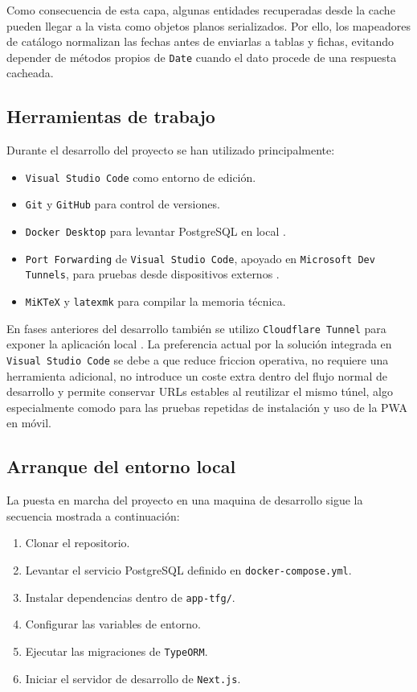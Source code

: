 Como consecuencia de esta capa, algunas entidades recuperadas desde la cache pueden llegar a la vista como objetos planos serializados. Por ello, los mapeadores de catálogo normalizan las fechas antes de enviarlas a tablas y fichas, evitando depender de métodos propios de \texttt{Date} cuando el dato procede de una respuesta cacheada.

\subsection{Herramientas de trabajo}

Durante el desarrollo del proyecto se han utilizado principalmente:

\begin{itemize}
    \item \texttt{Visual Studio Code} como entorno de edición.
    \item \texttt{Git} y \texttt{GitHub} para control de versiones.
    \item \texttt{Docker Desktop} para levantar PostgreSQL en local \citep{dockerdocs2026}.
    \item \texttt{Port Forwarding} de \texttt{Visual Studio Code}, apoyado en \texttt{Microsoft Dev Tunnels}, para pruebas desde dispositivos externos \citep{vscodeportforwarding2026,microsoftdevtunnelsfaq2026}.
    \item \texttt{MiKTeX} y \texttt{latexmk} para compilar la memoria técnica.
\end{itemize}

En fases anteriores del desarrollo también se utilizo \texttt{Cloudflare Tunnel} para exponer la aplicación local \citep{cloudflaretunnel2026}. La preferencia actual por la solución integrada en \texttt{Visual Studio Code} se debe a que reduce friccion operativa, no requiere una herramienta adicional, no introduce un coste extra dentro del flujo normal de desarrollo y permite conservar URLs estables al reutilizar el mismo túnel, algo especialmente comodo para las pruebas repetidas de instalación y uso de la PWA en móvil.

\subsection{Arranque del entorno local}

La puesta en marcha del proyecto en una maquina de desarrollo sigue la secuencia mostrada a continuación:

\begin{enumerate}
    \item Clonar el repositorio.
    \item Levantar el servicio PostgreSQL definido en \texttt{docker-compose.yml}.
    \item Instalar dependencias dentro de \texttt{app-tfg/}.
    \item Configurar las variables de entorno.
    \item Ejecutar las migraciones de \texttt{TypeORM}.
    \item Iniciar el servidor de desarrollo de \texttt{Next.js}.
\end{enumerate}

